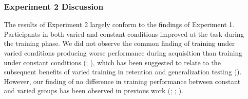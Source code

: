 \documentclass[
  11pt,
  letterpaper,
]{article}
\begin{document}
\subsubsection{Experiment 2 Discussion}\label{experiment-2-discussion}

The results of Experiment 2 largely conform to the findings of
Experiment 1. Participants in both varied and constant conditions
improved at the task during the training phase. We did not observe the
common finding of training under varied conditions producing worse
performance during acquisition than training under constant conditions
(;
), which has been suggested to relate to the subsequent
benefits of varied training in retention and generalization testing
(). However, our finding of no difference in training
performance between constant and varied groups has been observed in
previous work (;
;
).
\end{document}

